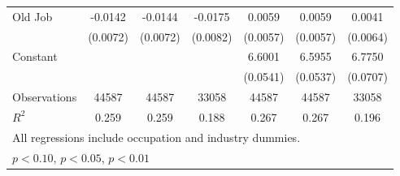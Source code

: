 {\begin{longtable}{l*{6}{c}}
Old Job             &     -0.0142\sym{**} &     -0.0144\sym{**} &     -0.0175\sym{**} &      0.0059         &      0.0059         &      0.0041         \\
                    &    (0.0072)         &    (0.0072)         &    (0.0082)         &    (0.0057)         &    (0.0057)         &    (0.0064)         \\
Constant            &                     &                     &                     &      6.6001\sym{***}&      6.5955\sym{***}&      6.7750\sym{***}\\
                    &                     &                     &                     &    (0.0541)         &    (0.0537)         &    (0.0707)         \\
\hline  
Observations        &       44587         &       44587         &       33058         &       44587         &       44587         &       33058         \\
\(R^{2}\)           &       0.259         &       0.259         &       0.188         &       0.267         &       0.267         &       0.196         \\
\hline  
\multicolumn{7}{l}{\footnotesize All regressions include occupation and industry dummies.}\\
\multicolumn{7}{l}{\footnotesize \sym{*} \(p<0.10\), \sym{**} \(p<0.05\), \sym{***} \(p<0.01\)}\\
\end{longtable}
}
